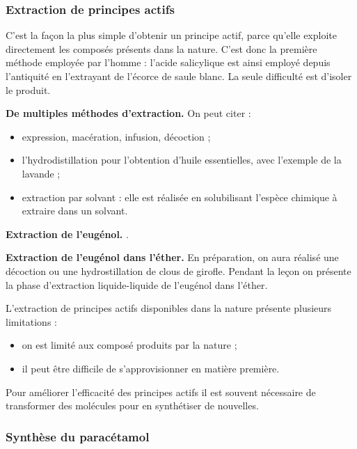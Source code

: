 \subsubsection{Extraction de principes actifs}

C'est la façon la plus simple d'obtenir un principe actif, parce qu'elle exploite directement les composés présents dans la nature.
C'est donc la première méthode employée par l'homme : l'acide salicylique est ainsi employé depuis l'antiquité en l'extrayant de l'écorce de saule blanc.
La seule difficulté est d'isoler le produit.
\begin{slide}
\textbf{De multiples méthodes d'extraction.}
On peut citer :
\begin{itemize}
\item expression, macération, infusion, décoction ;
\item l'hydrodistillation pour l'obtention d'huile essentielles, avec l'exemple de la lavande ;
\item extraction par solvant \cite{Prevost2017} : elle est réalisée en solubilisant l'espèce chimique à extraire dans un solvant. 
\end{itemize}
\end{slide}

\begin{slide}
\textbf{Extraction de l'eugénol.}
\cite{Prevost2017}.
\end{slide}

\begin{experience}
\textbf{Extraction de l'eugénol dans l'éther.}
En préparation, on aura réalisé une décoction ou une hydrostillation de clous de girofle.
Pendant la leçon on présente la phase d'extraction liquide-liquide de l'eugénol dans l'éther.
\end{experience}

\begin{transition}
L'extraction de principes actifs disponibles dans la nature présente plusieurs limitations :
\begin{itemize}
\item on est limité aux composé produits par la nature ;
\item il peut être difficile de s'approvisionner en matière première.
\end{itemize}
Pour améliorer l'efficacité des principes actifs il est souvent nécessaire de transformer des molécules pour en synthétiser de nouvelles.
\end{transition}

\subsubsection{Synthèse du paracétamol}

